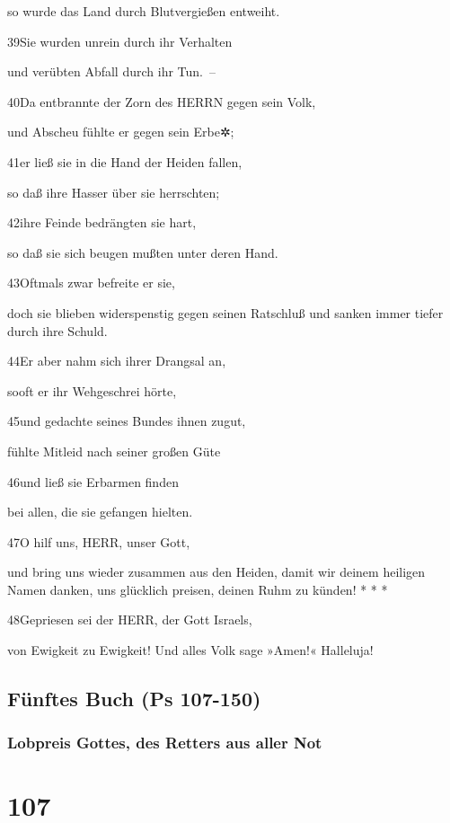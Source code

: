 so wurde das Land durch Blutvergießen entweiht.

39Sie wurden unrein durch ihr Verhalten

und verübten Abfall durch ihr Tun.~--

40Da entbrannte der Zorn des HERRN gegen sein Volk,

und Abscheu fühlte er gegen sein Erbe✲;

41er ließ sie in die Hand der Heiden fallen,

so daß ihre Hasser über sie herrschten;

42ihre Feinde bedrängten sie hart,

so daß sie sich beugen mußten unter deren Hand.

43Oftmals zwar befreite er sie,

doch sie blieben widerspenstig gegen seinen Ratschluß und sanken immer
tiefer durch ihre Schuld.

44Er aber nahm sich ihrer Drangsal an,

sooft er ihr Wehgeschrei hörte,

45und gedachte seines Bundes ihnen zugut,

fühlte Mitleid nach seiner großen Güte

46und ließ sie Erbarmen finden

bei allen, die sie gefangen hielten.

47O hilf uns, HERR, unser Gott,

und bring uns wieder zusammen aus den Heiden, damit wir deinem heiligen
Namen danken, uns glücklich preisen, deinen Ruhm zu künden! * * *

48Gepriesen sei der HERR, der Gott Israels,

von Ewigkeit zu Ewigkeit! Und alles Volk sage »Amen!« Halleluja!

\hypertarget{fuxfcnftes-buch-ps-107-150}{%
\subsection{Fünftes Buch (Ps
107-150)}\label{fuxfcnftes-buch-ps-107-150}}

\hypertarget{lobpreis-gottes-des-retters-aus-aller-not}{%
\subsubsection{Lobpreis Gottes, des Retters aus aller
Not}\label{lobpreis-gottes-des-retters-aus-aller-not}}

\hypertarget{section-106}{%
\section{107}\label{section-106}}

